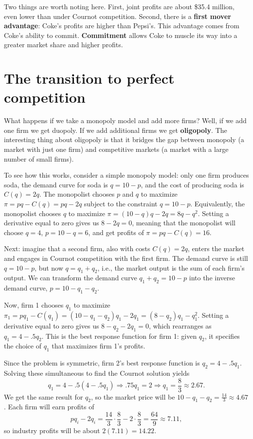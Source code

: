 Two things are worth noting here. First, joint profits are about \$35.4 million, even lower than under Cournot competition. Second, there is a \textbf{first mover advantage}: Coke's profits are higher than Pepsi's. This advantage comes from Coke's ability to commit. \textbf{Commitment} allows Coke to muscle its way into a greater market share and higher profits.


\section{The transition to perfect competition}

What happens if we take a monopoly model and add more firms? Well, if we add one firm we get duopoly. If we add additional firms we get \textbf{oligopoly}. The interesting thing about oligopoly is that it bridges the gap between monopoly (a market with just one firm) and competitive markets (a market with a large number of small firms).

To see how this works, consider a simple monopoly model: only one firm produces soda, the demand curve for soda is $q=10-p$, and the cost of producing soda is $C(q)=2q$. The monopolist chooses $p$ and $q$ to maximize $\pi=pq-C(q)=pq-2q$ subject to the constraint $q=10-p$. Equivalently, the monopolist chooses $q$ to maximize $\pi=(10-q)q-2q=8q-q^2$. Setting a derivative equal to zero gives us $8-2q=0$, meaning that the monopolist will choose $q=4$, $p=10-q=6$, and get profits of $\pi=pq-C(q)=16$.

Next: imagine that a second firm, also with costs $C(q)=2q$, enters the market and engages in Cournot competition with the first firm. The demand curve is still $q=10-p$, but now $q=q_1+q_2$, i.e., the market output is the sum of each firm's output. We can transform the demand curve $q_1+q_2=10-p$ into the inverse demand curve, $p=10-q_1-q_2$.

Now, firm 1 chooses $q_1$ to maximize $\pi_1=pq_1-C(q_1)=(10-q_1-q_2)q_1-2q_1=(8-q_2)q_1-q_1^2.$ Setting a derivative equal to zero gives us $8-q_2-2q_1=0$, which rearranges as $q_1=4-.5q_2$. This is the best response function for firm 1: given $q_2$, it specifies the choice of $q_1$ that maximizes firm 1's profits.

Since the problem is symmetric, firm 2's best response function is $q_2=4-.5q_1$. Solving these simultaneous to find the Cournot solution yields
\[
q_1=4-.5(4-.5q_1)\Longrightarrow .75q_1=2\Longrightarrow q_1=\frac{8}{3}\approx 2.67.
\]
We get the same result for $q_2$, so the market price will be $\displaystyle 10-q_1-q_2=\frac{14}{3}\approx 4.67$. Each firm will earn profits of
\[
pq_i-2q_i=\frac{14}{3}\cdot\frac{8}{3}-2\cdot\frac{8}{3}=\frac{64}{9}\approx 7.11,
\]
so industry profits will be about $2(7.11)=14.22$.

